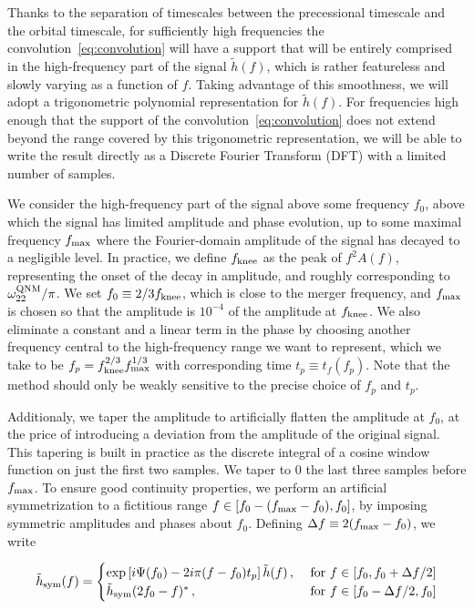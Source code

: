 \documentclass[aps,showpacs,twocolumn,
prd,superscriptaddress,nofootinbib]{revtex4-1}
\newcommand{\be}{\begin{equation}}
\newcommand{\ee}{\end{equation}}
\newcommand{\tf}{t_{f}}
\begin{document}
Thanks to the separation of timescales between the precessional timescale and the orbital timescale, for sufficiently high frequencies the convolution~\eqref{eq:convolution} will have a support that will be entirely comprised in the high-frequency part of the signal $\tilde{h}(f)$, which is rather featureless and slowly varying as a function of $f$. Taking advantage of this smoothness, we will adopt a trigonometric polynomial representation for $\tilde{h}(f)$. For frequencies high enough that the support of the convolution~\eqref{eq:convolution} does not extend beyond the range covered by this trigonometric representation, we will be able to write the result directly as a Discrete Fourier Transform (DFT) with a limited number of samples.

We consider the high-frequency part of the signal above some frequency $f_{0}$, above which the signal has limited amplitude and phase evolution, up to some maximal frequency $f_{\rm max}$ where the Fourier-domain amplitude of the signal has decayed to a negligible level. In practice, we define $f_{\rm knee}$ as the peak of $f^{2}A(f)$, representing the onset of the decay in amplitude, and roughly corresponding to $\omega_{22}^{\rm QNM}/\pi$. We set $f_{0}\equiv 2/3f_{\rm knee}$, which is close to the merger frequency, and $f_{\rm max}$ is chosen so that the amplitude is $10^{-4}$ of the amplitude at $f_{\rm knee}$. We also eliminate a constant and a linear term in the phase by choosing another frequency central to the high-frequency range we want to represent, which we take to be $f_{p} = f_{\rm knee}^{2/3} f_{\rm max}^{1/3}$ with corresponding time $t_{p}\equiv \tf(f_{p})$. Note that the method should only be weakly sensitive to the precise choice of $f_{p}$ and $t_{p}$.

Additionaly, we taper the amplitude to artificially flatten the amplitude at $f_{0}$, at the price of introducing a deviation from the amplitude of the original signal. This tapering is built in practice as the discrete integral of a cosine window function on just the first two samples. We taper to 0 the last three samples before $f_{\rm max}$. To ensure good continuity properties, we perform an artificial symmetrization to a fictitious range $f\in [f_{0} - (f_{\rm max} - f_{0}), f_{0}]$, by imposing symmetric amplitudes and phases about $f_{0}$. Defining $\Delta f \equiv 2 (f_{\rm max} - f_{0})$, we write
\begin{widetext}
\be\label{eq:defhsym}
	\tilde{h}_{\rm sym}(f) = 
	\begin{cases} 
		\exp\left[i \Psi(f_{0}) - 2i\pi (f-f_{0}) t_{p} \right] \tilde{h}(f) \,,  &\text{ for } f \in [f_{0}, f_{0} + \Delta f /2] \\
	\tilde{h}_{\rm sym}(2 f_{0} - f)^{*} \,,  &\text{ for } f \in [f_{0} - \Delta f/2, f_{0}]
	\end{cases}
\ee
\end{widetext}
\end{document}
